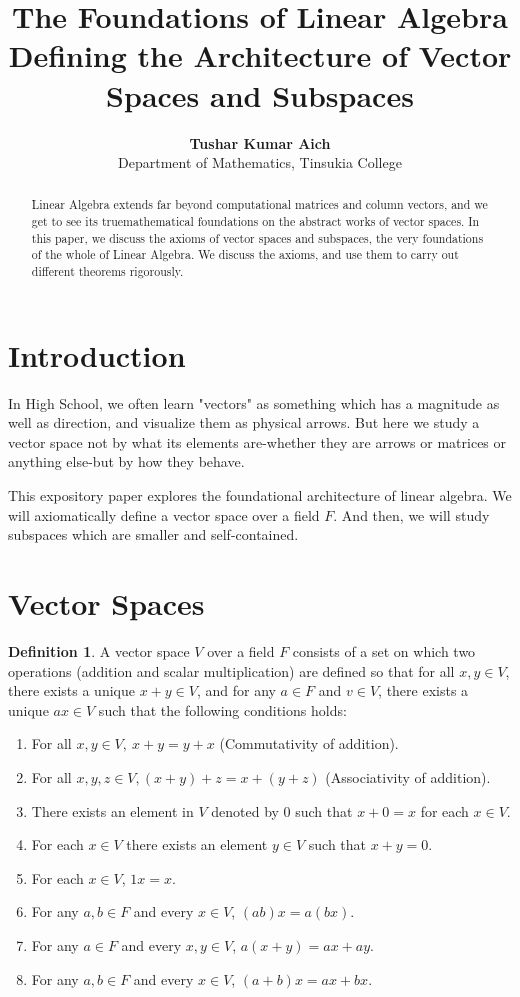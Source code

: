 \documentclass[12pt, a4paper]{article}
\title{\textbf{\Large The Foundations of Linear Algebra \\ \large Defining the Architecture of Vector Spaces and Subspaces}}
\author{\textbf{Tushar Kumar Aich} \\
\small{Department of Mathematics, Tinsukia College}
}
\theoremstyle{definition}
\newtheorem{definition}{Definition}[section]
\theoremstyle{remark}
\theoremstyle{solution}
\begin{document}
\maketitle

\begin{abstract}
    Linear Algebra extends far beyond computational matrices and column vectors, and we get to see its truemathematical foundations on the abstract works of vector spaces. In this paper, we discuss the axioms of vector spaces and subspaces, the very foundations of the whole of Linear Algebra. We discuss the axioms, and use them to carry out different theorems rigorously.
\end{abstract}

\section{Introduction}
In High School, we often learn "vectors" as something which has a magnitude as well as direction, and visualize them as physical arrows. But here we study a vector space not by what its elements are-whether they are arrows or matrices or anything else-but by how they behave.

\vspace{0.2cm}

This expository paper explores the foundational architecture of linear algebra. We will axiomatically define a vector space over a field $F$. And then, we will study subspaces which are smaller and self-contained.

\section{Vector Spaces}
\begin{definition}
    A vector space $V$ over a field $F$ consists of a set on which two operations (addition and scalar multiplication) are defined so that for all $x, y \in V$, there exists a unique $x + y \in V$, and for any $a \in F$ and $v \in V$, there exists a unique $ax \in V$ such that the following conditions holds:
\end{definition}

\begin{enumerate}[label=(VS \arabic*), leftmargin=0.7in]
    \item For all $x,y \in V, \ x+y=y+x$ (Commutativity of addition).
    \item For all $x,y,z \in V, (x+y)+z=x+(y+z)$ (Associativity of addition).
    \item There exists an element in $V$ denoted by $0$ such that $x+0=x$ for each $x \in V$.
    \item For each $x \in V$ there exists an element $y \in V$ such that $x+y=0$.
    \item For each $x \in V$, $1x=x$.
    \item For any $a,b \in F$ and every $x \in V$, $(ab)x=a(bx)$.
    \item For any $a \in F$ and every $x,y \in V$, $a(x+y)=ax+ay$.
    \item For any $a,b \in F$ and every $x \in V$, $(a+b)x=ax+bx$.
\end{enumerate}
\end{document}
